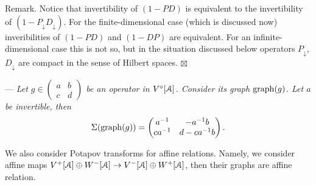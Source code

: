 \documentclass[]{amsart}
\newcommand{\graph}{\mathop{\rm graph}\nolimits}
\def\cA{\EuScript A}
\def\sm{\smallskip}
\begin{document}
\sm




{\sc Remark.} 
Notice that invertibility of $(1-PD)$ is equivalent to the invertibility of 
$(1-P_\downarrow D_\downarrow)$. For the finite-dimensional case (which is discussed now)
inveribilities of $(1-PD)$ and $(1-DP)$ are equivalent. For an infinite-dimensional
case this is not so, but in the situation discussed below
operators $P_\downarrow$, $D_\downarrow$ are compact in the sense of
Hilbert spaces.
\hfill $\boxtimes$

\sm 

--- {\it  Let $g\in \begin{pmatrix}
		a&b\\c&d
	\end{pmatrix}$
	be an operator in $V^\diamond[\cA]$. Consider its graph
	$\graph(g)$.
	Let $a$ be invertible, then}
\begin{equation}
	\Sigma(\graph(g))=\begin{pmatrix}
		a^{-1}&-a^{-1}b\\ca^{-1}&d-ca^{-1}b
	\end{pmatrix}.
	\label{eq:Pi-matritsa}
\end{equation}

\sm

We also consider Potapov transforms for affine relations.
Namely, we consider
affine maps 	
$V^+[\cA]\oplus W^-[\cA]\to V^-[\cA]\oplus W^+[\cA]$,
then their graphs are affine relation.

\sm 
\end{document}
